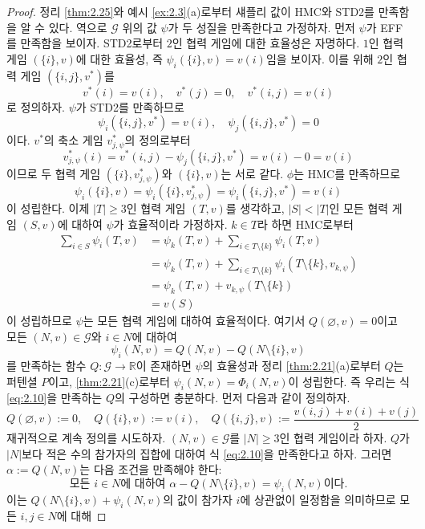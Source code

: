 \documentclass{article}
\numberwithin{equation}{section}
\begin{document}
\begin{proof}
	정리 \ref{thm:2.25}와 예시 \ref{ex:2.3}(a)로부터 섀플리 값이 HMC와 STD2를 만족함을 알 수 있다. 역으로 $\mathcal G$ 위의 값 $\psi$가 두 성질을 만족한다고 가정하자. 먼저 $\psi$가 EFF를 만족함을 보이자. STD2로부터 $2$인 협력 게임에 대한 효율성은 자명하다. $1$인 협력 게임 $(\{i\},v)$에 대한 효율성, 즉 $\psi_i(\{i\},v)=v(i)$임을 보이자. 이를 위해 $2$인 협력 게임 $(\{i,j\},v^*)$를
	\[
		v^*(i)=v(i),\quad v^*(j)=0,\quad v^*(i,j)=v(i)
	\]
	로 정의하자. $\psi$가 STD2를 만족하므로
	\[
		\psi_i(\{i,j\},v^*)=v(i),\quad\psi_j(\{i,j\},v^*)=0
	\]
	이다. $v^*$의 축소 게임 $v^*_{j,\psi}$의 정의로부터
	\[
		v^*_{j,\psi}(i)=v^*(i,j)-\psi_j(\{i,j\},v^*)=v(i)-0=v(i)
	\]
	이므로 두 협력 게임 $(\{i\},v^*_{j,\psi})$와 $(\{i\},v)$는 서로 같다. $\phi$는 HMC를 만족하므로
	\[
		\psi_i(\{i\},v)=\psi_i(\{i\},v^*_{j,\psi})=\psi_i(\{i,j\},v^*)=v(i)
	\]
	이 성립한다. 이제 $\vert T\vert\geq3$인 협력 게임 $(T,v)$를 생각하고, $\vert S\vert<\vert T\vert$인 모든 협력 게임 $(S,v)$에 대하여 $\psi$가 효율적이라 가정하자. $k\in T$라 하면 HMC로부터
	\[
		\begin{aligned}
			\sum_{i\in S}\psi_i(T,v)&=\psi_k(T,v)+\sum_{i\in T\setminus\{k\}}\psi_i(T,v)\\
			&=\psi_k(T,v)+\sum_{i\in T\setminus\{k\}}\psi_i(T\setminus\{k\},v_{k,\psi})\\
			&=\psi_k(T,v)+v_{k,\psi}(T\setminus\{k\})\\
			&=v(S)
		\end{aligned}
	\]
	이 성립하므로 $\psi$는 모든 협력 게임에 대하여 효율적이다. 여기서 $Q(\varnothing,v)=0$이고 모든 $(N,v)\in\mathcal G$와 $i\in N$에 대하여
	\begin{equation}
		\label{eq:2.10}
		\psi_i(N,v)=Q(N,v)-Q(N\setminus\{i\},v)
	\end{equation}
	를 만족하는 함수 $Q:\mathcal G\to\mathbb R$이 존재하면 $\psi$의 효율성과 정리 \ref{thm:2.21}(a)로부터 $Q$는 퍼텐셜 $P$이고, \ref{thm:2.21}(c)로부터 $\psi_i(N,v)=\Phi_i(N,v)$이 성립한다. 즉 우리는 식 \ref{eq:2.10}을 만족하는 $Q$의 구성하면 충분하다. 먼저 다음과 같이 정의하자.
	\[
		Q(\varnothing,v):=0,\quad Q(\{i\},v):=v(i),\quad Q(\{i,j\},v):=\frac{v(i,j)+v(i)+v(j)}{2}
	\]
	재귀적으로 계속 정의를 시도하자. $(N,v)\in\mathcal G$를 $\vert N\vert\geq3$인 협력 게임이라 하자. $Q$가 $\vert N\vert$보다 적은 수의 참가자의 집합에 대하여 식 \ref{eq:2.10}을 만족한다고 하자. 그러면 $\alpha:=Q(N,v)$는 다음 조건을 만족해야 한다:
	\[
		\text{모든 }i\in N\text{에 대하여 }\alpha-Q(N\setminus\{i\},v)=\psi_i(N,v)\text{이다.}
	\]
	이는 $Q(N\setminus\{i\},v)+\psi_i(N,v)$의 값이 참가자 $i$에 상관없이 일정함을 의미하므로 모든 $i,j\in N$에 대해

\end{proof}
\end{document}
